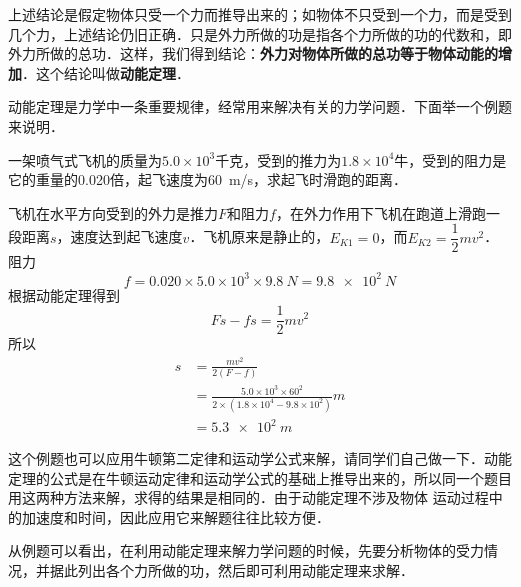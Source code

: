 上述结论是假定物体只受一个力而推导出来的；如物体不只受到一个力，而是受到几个力，上述结论仍旧正确．只是外力所做的功是指各个力所做的功的代数和，即外力所做的总功．这样，我们得到结论：\textbf{外力对物体所做的总功等于物体动能的增加}．这个结论叫做\textbf{动能定理}．

动能定理是力学中一条重要规律，经常用来解决有关的力学问题．下面举一个例题来说明．


\begin{example}
    一架喷气式飞机的质量为$5.0\times 10^3$千克，受到的推力为$1.8\times 10^4$牛，受到的阻力是它的重量的0.020倍，起飞速度为\qty{60}{m/s}，求起飞时滑跑的距离．
\end{example}


\begin{solution}
    飞机在水平方向受到的外力是推力$F$和阻力$f$，在外力作用下飞机在跑道上滑跑一段距离$s$，速度达到起飞速度$v$．飞机原来是静止的，$E_{K1}=0$，而$E_{K2}=\dfrac{1}{2}mv^2$．阻力
    $$f=0.020\times 5.0\times 10^{3}\times \qty{9.8}{N}=\qty{9.8e2}{N}$$
    根据动能定理得到
    \[Fs-fs=\frac{1}{2}mv^2 \]
    所以
    \[\begin{split}
            s & =\frac{mv^2}{2(F-f)}                                                                  \\
              & =\frac{5.0\times 10^{3}\times 60^2}{2\times (1.8\times 10^{4}-9.8\times 10^2)}\si{ m} \\
              & =\qty{5.3e2}{m}
        \end{split}\]
\end{solution}

这个例题也可以应用牛顿第二定律和运动学公式来解，请同学们自己做一下．动能定理的公式是在牛顿运动定律和运动学公式的基础上推导出来的，所以同一个题目用这两种方法来解，求得的结果是相同的．由于动能定理不涉及物体
运动过程中的加速度和时间，因此应用它来解题往往比较方便．

从例题可以看出，在利用动能定理来解力学问题的时候，先要分析物体的受力情况，并据此列出各个力所做的功，然后即可利用动能定理来求解．

